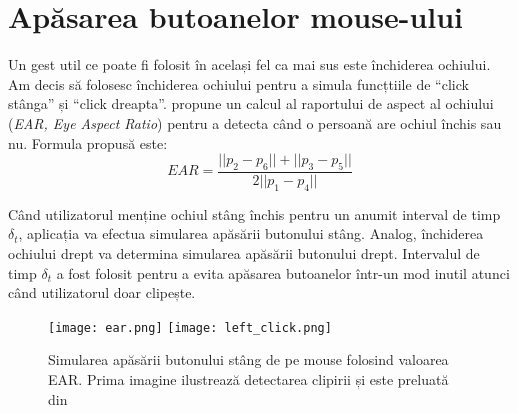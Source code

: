\section{Apăsarea butoanelor mouse-ului}
Un gest util ce poate fi folosit în același fel ca mai sus este închiderea ochiului.
Am decis să folosesc închiderea ochiului pentru a simula funcțtiile de ``click stânga'' și ``click dreapta''.
\cite{blink_detection} propune un calcul al raportului de aspect al ochiului (\emph{EAR, Eye Aspect Ratio}) pentru a detecta când o persoană are ochiul închis sau nu.
Formula propusă este:
$$EAR = \frac{||p_2 - p_6|| + ||p_3 - p_5||}{2||p_1 - p_4||}$$


Când utilizatorul menține ochiul stâng închis pentru un anumit interval de timp $\delta_t$, aplicația va efectua simularea apăsării butonului stâng.
Analog, închiderea ochiului drept va determina simularea apăsării butonului drept.
Intervalul de timp $\delta_t$ a fost folosit pentru a evita apăsarea butoanelor într-un mod inutil atunci când utilizatorul doar clipește.

\begin{figure}[H]
    \centering
    \texttt{[image: ear.png]}
    \texttt{[image: left\_click.png]}
    \caption{Simularea apăsării butonului stâng de pe mouse folosind valoarea EAR. Prima imagine ilustrează detectarea clipirii și este preluată din \cite{blink_detection}}
\end{figure}